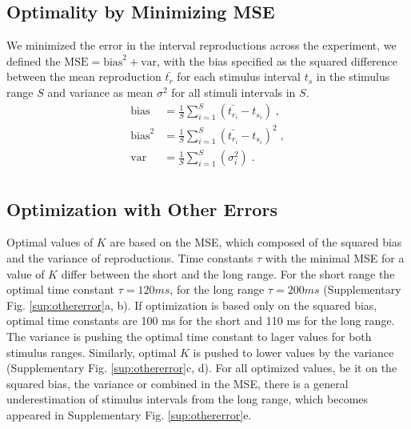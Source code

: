 \documentclass[10pt]{article}
\begin{document}
\subsection*{Optimality by Minimizing MSE}
We minimized the error in the interval reproductions across the experiment, we defined the $\text{MSE} = \text{bias}^2+\text{var}$, with the bias specified as the squared difference between the mean reproduction $\bar{t_{r}}$ for each stimulus interval $t_s$ in the stimulus range $S$ and variance as mean $\sigma^2$ for all stimuli intervals in $S$.
\begin{equation} \label{MSE}
	\begin{split}
	 \text{bias} & = \frac{1}{S} \sum \limits_{i=1}^{S} (\bar{t_{r_i}} - t_{s_i}) \;,\\
	 \text{bias}^2 & = \frac{1}{S} \sum \limits_{i=1}^{S}(\bar{t_{r_i}} - t_{s_i})^2 \;,\\
	 \text{var} & = \frac{1}{S} \sum \limits_{i=1}^{S}(\sigma_i^2) \;.\\
	\end{split}
\end{equation}

\subsection*{Optimization with Other Errors}
Optimal values of $K$ are based on the MSE, which composed of the squared bias and the variance of reproductions. 
Time constants $\tau$ with the minimal MSE for a value of $K$ differ between the short and the long range. For the short range the optimal time constant $\tau = 120 ms$, for the long range $\tau = 200 ms$ (Supplementary Fig. \ref{sup:othererror}a, b). If optimization is based only on the squared bias, optimal time constants are 100 ms for the short and 110 ms for the long range. 
The variance is pushing the optimal time constant to lager values for both stimulus ranges. 
Similarly, optimal $K$ is pushed to lower values by the variance (Supplementary Fig. \ref{sup:othererror}c, d).
For all optimized values, be it on the squared bias, the variance or combined in the MSE, there is a general underestimation of stimulus intervals from the long range, which becomes appeared in Supplementary Fig. \ref{sup:othererror}e.
\end{document}
